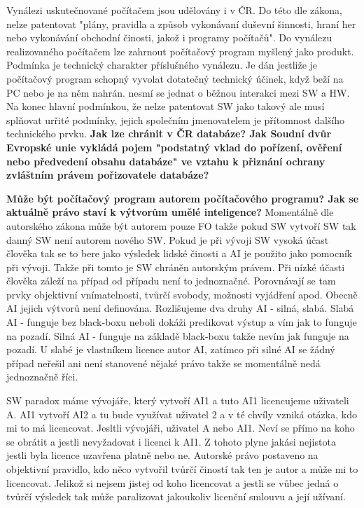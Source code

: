 \documentclass[12pt,a4paper,czech]{report}
\newcommand{\nadpis}[1]{\noindent\textbf{\Large{#1}}\normalsize}
\begin{document}
Vynálezi uskutečnované počítačem jsou udělovány i v ČR. Do této dle zákona, nelze patentovat "plány, pravidla a způsob vykonávaní duševní šinnosti, hraní her nebo vykonávání obchodní činosti, jakož i programy počítačů".
Do vynálezu realizovaného počítačem lze zahrnout počítačový program myšlený jako produkt. Podmínka je technický charakter příslušného vynálezu. Je dán jestliže je počítačový program schopný vyvolat dotatečný technický účinek, když beží na PC nebo je na něm nahrán. nesmí se jednat o běžnou interakci mezi SW a HW.  
Na konec hlavní podmínkou, že nelze patentovat SW jako takový ale musí splňovat urřité podmínky, jejich společním jmenovatelem je přítomnost dalšího technického prvku. 
\newline
\newline
\nadpis{Jak lze chránit v ČR databáze? Jak Soudní dvůr Evropské unie vykládá pojem "podstatný vklad do pořízení, ověření nebo předvedení obsahu databáze" ve vztahu k přiznání ochrany zvláštním právem pořizovatele databáze?}
\newline
\newline

\newline
\newline
\nadpis{Může být počítačový program autorem počítačového programu? Jak se aktuálně právo staví k výtvorům umělé inteligence?}
\newline
\newline
Momentálně dle autorského zákona může být autorem pouze FO takže pokud SW vytvoří SW tak danný SW není autorem nového SW. Pokud je při vývoji SW vysoká účast člověka tak se to bere jako výsledek lidské činosti a AI je použito jako pomocník při vývoji. Takže při tomto je SW chráněn autorským právem. Při nízké účasti člověka záleží na případ od případu není to jednoznačné. Porovnávají se tam prvky objektivní vnímatelnosti, tvůrčí svobody, možnosti vyjádření apod. Obecně AI jejich výtvorů není definována. Rozlišujeme dva druhy AI - silná, slabá. Slabá AI - funguje bez black-boxu neboli dokáži predikovat výstup a vím jak to funguje na pozadí. Silná AI - funguje na základě black-boxu takže nevím jak funguje na pozadí. U slabé je vlastníkem licence autor AI, zatímco při silné AI se žádný případ neřešil ani není stanovené nějaké právo takže se momentálně nedá jednoznačně říci.

SW paradox máme vývojáře, který vytvoří AI1 a tuto AI1 licencujeme uživateli A. AI1 vytvoří AI2 a tu bude využívat uživatel 2 a v té chvíly vzniká otázka, kdo mi to má licencovat. Jesltli vývojáři, uživatel A nebo AI1. Neví se přímo na koho se obrátit a jestli nevyžadovat i licenci k AI1. Z tohoto plyne jakási nejistota jestli byla licence uzavřena platně nebo ne. Autorské právo postaveno na objektivní pravidlo, kdo něco vytvořil tvůrčí čiností tak ten je autor a může mi to licencovat. Jelikož si nejsem jistej od koho licencovat a jestli se vůbec jedná o tvůrčí výsledek tak může paralizovat jakoukoliv licenční smlouvu a její užívaní.
\end{document}
